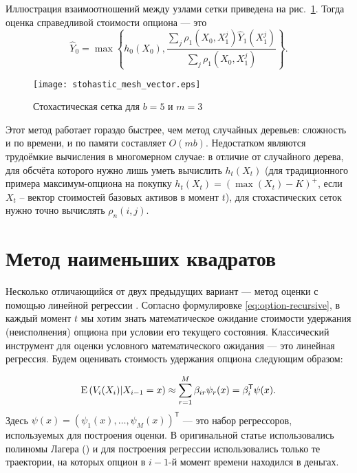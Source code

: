 Иллюстрация взаимоотношений между узлами сетки приведена на рис.~\ref{fig:stochastic_mesh}. Тогда оценка справедливой стоимости опциона --- это $$\hat Y_0 = \max\left\lbrace h_0(X_0), \frac{\sum_j \rho_{1}(X_0, X_1^j) \hat Y_{1}(X_1^j)}{\sum_j \rho_{1}(X_0, X_1^j)} \right\rbrace.$$

\begin{figure}[t]
    \centering
    \texttt{[image: stohastic\_mesh\_vector.eps]}
    \caption{Стохастическая сетка для $b = 5$ и $m = 3$}
    \label{fig:stochastic_mesh}
\end{figure}

Этот метод работает гораздо быстрее, чем метод случайных деревьев: сложность и по времени, и по памяти составляет $O(mb)$. Недостатком являются трудоёмкие вычисления в многомерном случае: в отличие от случайного дерева, для обсчёта которого нужно лишь уметь вычислить $h_t(X_t)$ (для традиционного примера максимум-опциона на покупку $h_t(X_t) = \left(\max(X_t) - K\right)^+$, если $X_t$ -- вектор стоимостей базовых активов в момент $t$), для стохастических сеток нужно точно вычислять $\rho_n(i, j)$.


\section{Метод наименьших квадратов} %
\label{sec:classic_approaches:least_squares}

Несколько отличающийся от двух предыдущих вариант --- метод оценки с помощью линейной регрессии \cite{Longstaff2001}. Согласно формулировке \eqref{eq:option-recursive}, в каждый момент $t$ мы хотим знать математическое ожидание стоимости удержания (неисполнения) опциона при условии его текущего состояния. Классический инструмент для оценки условного математического ожидания --- это линейная регрессия. Будем оценивать стоимость удержания опциона следующим образом:

\begin{equation}\label{eq:lsm_continuation}
\mathrm{E}\left(V_i(X_i)\middle\vert X_{i-1} = x\right) \approx \sum_{r=1}^M \beta_{ir} \psi_r(x) = \beta_i^\mathsf{T}\psi(x).
\end{equation}
Здесь $\psi(x) = \left(\psi_1(x), \dots, \psi_M(x)\right)^\mathsf{T}$ --- это набор регрессоров, используемых для построения оценки. В оригинальной статье использовались полиномы Лагера (\cite[секция~2.2 на стр.~122]{Longstaff2001}) и для построения регрессии использовались только те траектории, на которых опцион в $i-1$-й момент времени находился в деньгах.

